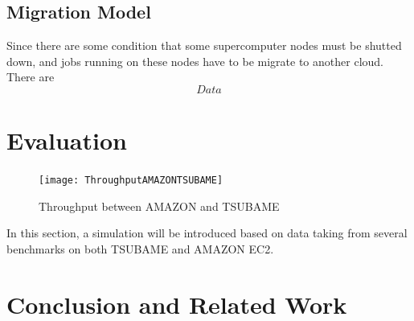 \documentclass[JIP,draft]{ipsj}
\begin{document}
\subsection{Migration Model}
Since there are some condition that some supercomputer nodes must be shutted down, and jobs running on these nodes have to be migrate to another cloud. There are 
\begin{equation}
	Data	
\end{equation}

\section{Evaluation}
\begin{figure}[tb]
	\centering
	\texttt{[image: ThroughputAMAZONTSUBAME]}
	\caption{Throughput between AMAZON and TSUBAME}
	\label{Throughput between AMAZON and TSUBAME}
\end{figure}

In this section, a simulation will be introduced based on data taking from several benchmarks on both TSUBAME and AMAZON EC2.

\section{Conclusion and Related Work}
\end{document}
